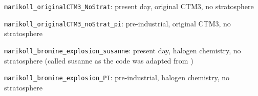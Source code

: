 \begin{mydef}\label{def:origCTM3_PD}
    \texttt{marikoll\_originalCTM3\_NoStrat}: present day, original CTM3, no stratosphere
\end{mydef}

\begin{mydef}\label{def:origCTM3_PI} 
    \texttt{marikoll\_originalCTM3\_noStrat\_pi}: pre-industrial, original CTM3, no stratosphere
\end{mydef}
    
\begin{mydef}\label{def:BE_PD}
    \texttt{marikoll\_bromine\_explosion\_susanne}: present day, halogen chemistry, no stratosphere (called susanne as the code was adapted from \cite{Susanne})
\end{mydef}
    
\begin{mydef}\label{def:BE_PI}
    \texttt{marikoll\_bromine\_explosion\_PI}: pre-industrial, halogen chemistry, no stratosphere
\end{mydef}
